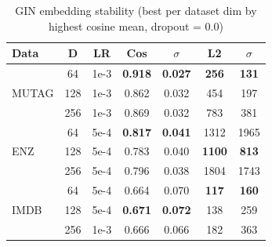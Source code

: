 \begin{table}
\centering
\footnotesize
\setlength{\tabcolsep}{3pt}
\begin{tabular}{l c c c c c c}
\hline
\textbf{Data} & \textbf{D} & \textbf{LR} &
\textbf{Cos} & \textbf{$\sigma$} &
\textbf{L2} & \textbf{$\sigma$} \\
\hline
 & 64  & 1e-3 & \textbf{0.918} & \textbf{0.027} & \textbf{256} & \textbf{131} \\
MUTAG & 128 & 1e-3 & 0.862 & 0.032 & 454 & 197 \\
 & 256 & 1e-3 & 0.869 & 0.032 & 783 & 381 \\
\hline
   & 64  & 5e-4 & \textbf{0.817} & \textbf{0.041} & 1312 & 1965 \\
ENZ   & 128 & 5e-4 & 0.783 & 0.040 & \textbf{1100} & \textbf{813} \\
   & 256 & 5e-4 & 0.796 & 0.038 & 1804 & 1743 \\
\hline
 & 64  & 5e-4 & 0.664 & 0.070 & \textbf{117} & \textbf{160} \\
IMDB  & 128 & 5e-4 & \textbf{0.671} & \textbf{0.072} & 138 & 259 \\
  & 256 & 1e-3 & 0.666 & 0.066 & 182 & 363 \\
\hline
\end{tabular}
\caption{GIN embedding stability (best per dataset dim by highest cosine mean, dropout = 0.0)}
\label{tab:stability_gin_best_cos}
\end{table}




